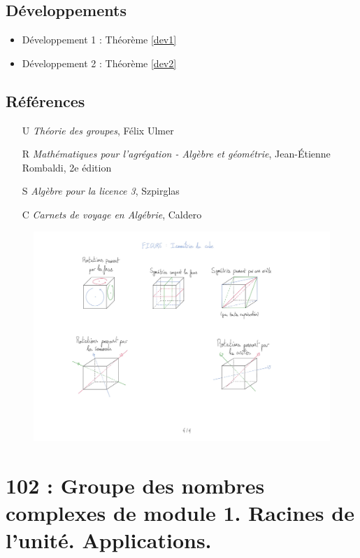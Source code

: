 \documentclass[10pt, a4paper, parskip=full, twoside, twocolumn]{report}
\begin{document}
\section*{Développements}
\begin{itemize}
	\item Développement 1 : Théorème \ref{dev1}
	\item Développement 2 : Théorème \ref{dev2}
\end{itemize}

\section*{Références}
\begin{itemize}
	\item[U] \emph{Théorie des groupes}, Félix Ulmer
	\item[R] \emph{Mathématiques pour l'agrégation - Algèbre et géométrie}, Jean-Étienne Rombaldi, 2e édition
	\item[S] \emph{Algèbre pour la licence 3}, Szpirglas
	\item[C] \emph{Carnets de voyage en Algébrie}, Caldero
\end{itemize}

\begin{figure}[!htb]
	\centering
	\includegraphics[trim={0 0 0 0},clip,width=1\linewidth]{img/101.pdf}
\end{figure}




\chapter*{102 : Groupe des nombres complexes de module 1. Racines de l'unité. Applications.}
\setcounter{definition}{0}
\end{document}

